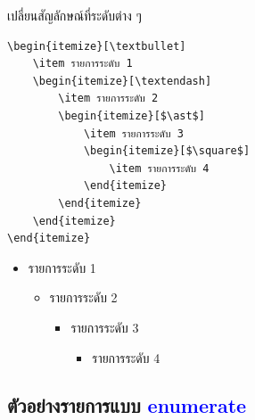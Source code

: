 \begin{exampleBox}[lefthand ratio=0.55,sidebyside]{เปลี่ยนสัญลักษณ์ที่ระดับต่าง ๆ}
\small
\begin{lstlisting}[frame=none,language={[LaTeX]TeX}]
\begin{itemize}[\textbullet]
    \item รายการระดับ 1
    \begin{itemize}[\textendash]
        \item รายการระดับ 2
        \begin{itemize}[$\ast$]
            \item รายการระดับ 3
            \begin{itemize}[$\square$]
                \item รายการระดับ 4
            \end{itemize}
        \end{itemize}
    \end{itemize}
\end{itemize}
\end{lstlisting}
\tcblower
\small
\begin{itemize}[\textbullet,noitemsep,leftmargin=*,]
    \item รายการระดับ 1
    \begin{itemize}[\textendash]
        \item รายการระดับ 2
        \begin{itemize}[$\ast$]
            \item รายการระดับ 3
            \begin{itemize}[$\square$]
                \item รายการระดับ 4
            \end{itemize}
        \end{itemize}
    \end{itemize}
\end{itemize}
\end{exampleBox}


\subsection{ตัวอย่างรายการแบบ \textcolor{blue}{enumerate}}

